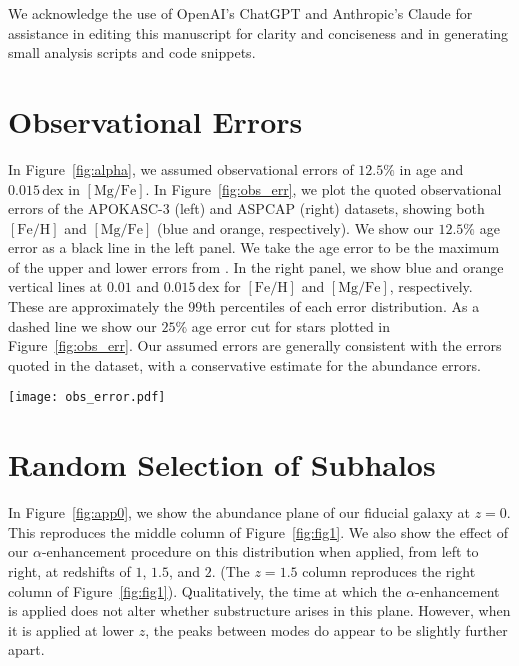 \documentclass[twocolumn]{aastex631}
\newcommand{\FeH}{\ensuremath{[\textrm{Fe}/\textrm{H}]}}
\newcommand{\MgFe}{\ensuremath{[\textrm{Mg}/\textrm{Fe}]}}
\newcommand{\dex}{\ensuremath{\textrm{dex}}}
\begin{document}
We acknowledge the use of OpenAI’s ChatGPT and Anthropic's Claude for assistance in editing this manuscript for clarity and conciseness and in generating small analysis scripts and code snippets.


{}


\appendix

\section{Observational Errors}\label{app:obs_err}
In Figure~\ref{fig:alpha}, we assumed observational errors of $12.5\%$ in age and $0.015\,\dex$ in \MgFe{}. In Figure~\ref{fig:obs_err}, we plot the quoted observational errors of the APOKASC-3 (left) and ASPCAP (right) datasets, showing both \FeH{} and \MgFe{} (blue and orange, respectively). We show our $12.5\%$ age error as a black line in the left panel. We take the age error to be the maximum of the upper and lower errors from \citet{2018ApJS..239...32P}. In the right panel, we show blue and orange vertical lines at $0.01$ and $0.015\,\dex$ for \FeH{} and \MgFe{}, respectively. These are approximately the 99th percentiles of each error distribution. As a dashed line we show our $25\%$ age error cut for stars plotted in Figure~\ref{fig:obs_err}. Our assumed errors are generally consistent with the errors quoted in the dataset, with a conservative estimate for the abundance errors.

\begin{figure*}
  \centering
  \texttt{[image: obs\_error.pdf]}
  \caption{The observational errors of astroseismic ages from APOKASC-3 (left) and abundances from ASPCAP DR17 (right). We show, on the left, a line indicating a $12.5\%$ error in observed age and on the right a vertical line indicating a $0.01$ and $0.015\,\dex$ error in \FeH{} and \MgFe{}, respectively. On the left, a dashed line indicates the $25\%$ error cut used for inclusion in Figure~\ref{fig:alpha}.}
  \label{fig:obs_err}
\end{figure*}

\section{Random Selection of Subhalos}\label{app:rand_fig1}
In Figure~\ref{fig:app0}, we show the abundance plane of our fiducial galaxy at $z=0$. This reproduces the middle column of Figure~\ref{fig:fig1}. We also show the effect of our $\alpha$-enhancement procedure on this distribution when applied, from left to right, at redshifts of $1$, $1.5$, and $2$. (The $z=1.5$ column reproduces the right column of Figure~\ref{fig:fig1}). Qualitatively, the time at which the $\alpha$-enhancement is applied does not alter whether substructure arises in this plane. However, when it is applied at lower $z$, the peaks between modes do appear to be slightly further apart.
\end{document}
